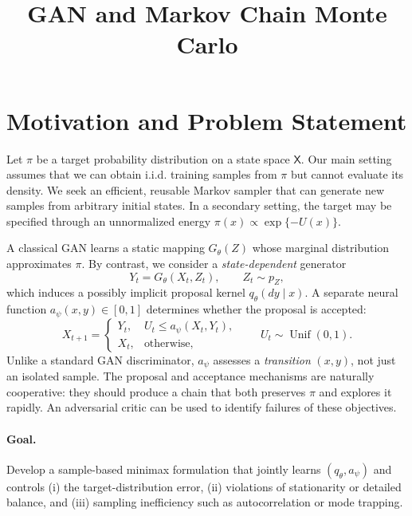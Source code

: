\documentclass[11pt]{article}
\title{\bf GAN and Markov Chain Monte Carlo}
\date{}
\begin{document}
\maketitle



\section{Motivation and Problem Statement}
Let $\pi$ be a target probability distribution on a state space $\mathsf X$. Our main setting assumes that we can obtain i.i.d. training samples from $\pi$ but cannot evaluate its density. We seek an efficient, reusable Markov sampler that can generate new samples from arbitrary initial states. In a secondary setting, the target may be specified through an unnormalized energy $\pi(x)\propto\exp\{-U(x)\}$.

A classical GAN learns a static mapping $G_\theta(Z)$ whose marginal distribution approximates $\pi$. By contrast, we consider a \emph{state-dependent} generator
\begin{equation}
Y_t=G_\theta(X_t,Z_t),\qquad Z_t\sim p_Z,
\label{eq:proposal}
\end{equation}
which induces a possibly implicit proposal kernel $q_\theta(dy\mid x)$. A separate neural function $a_\psi(x,y)\in[0,1]$ determines whether the proposal is accepted:
\begin{equation}
X_{t+1}=\begin{cases}
Y_t, & U_t\le a_\psi(X_t,Y_t),\\
X_t, & \text{otherwise},
\end{cases}\qquad U_t\sim\operatorname{Unif}(0,1).
\label{eq:chain}
\end{equation}
Unlike a standard GAN discriminator, $a_\psi$ assesses a \emph{transition} $(x,y)$, not just an isolated sample. The proposal and acceptance mechanisms are naturally cooperative: they should produce a chain that both preserves $\pi$ and explores it rapidly. An adversarial critic can be used to identify failures of these objectives.

\paragraph{Goal.} Develop a sample-based minimax formulation that jointly learns $(q_\theta,a_\psi)$ and controls (i) the target-distribution error, (ii) violations of stationarity or detailed balance, and (iii) sampling inefficiency such as autocorrelation or mode trapping.
\end{document}
